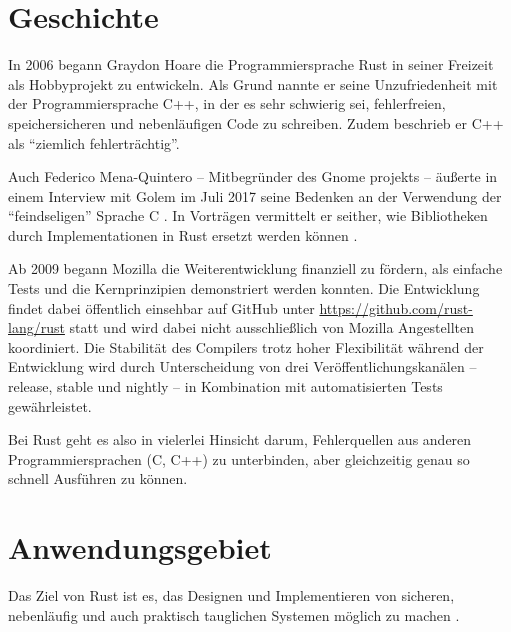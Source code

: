  \cite{rust:orly_y_rust}


\section{Geschichte}
\label{rust:history}

In 2006 \cite{rust:faq} begann Graydon Hoare die Programmiersprache Rust in seiner Freizeit als Hobbyprojekt zu entwickeln.
Als Grund nannte er seine Unzufriedenheit mit der Programmiersprache C++, in der es sehr schwierig sei, fehlerfreien, speichersicheren und nebenläufigen Code zu schreiben.
Zudem beschrieb er C++ als \enquote{ziemlich fehlerträchtig}. \cite{rust:heise_interview_graydon}

Auch Federico Mena-Quintero -- Mitbegründer des Gnome projekts  --
äußerte in einem Interview mit Golem im Juli 2017 seine Bedenken an der Verwendung der \enquote{feindseligen} Sprache C \cite{rust:c_is_hostile_golem}.
In Vorträgen  vermittelt er seither, wie Bibliotheken durch Implementationen in Rust ersetzt werden können \cite{rust:c_is_hostile_mena}.

Ab 2009 begann Mozilla die Weiterentwicklung finanziell zu fördern, als einfache Tests und die Kernprinzipien demonstriert werden konnten.
Die Entwicklung findet dabei öffentlich einsehbar auf GitHub unter \url{https://github.com/rust-lang/rust} statt und wird dabei nicht ausschließlich von Mozilla Angestellten koordiniert.
Die Stabilität des Compilers trotz hoher Flexibilität während der Entwicklung wird durch Unterscheidung von drei Veröffentlichungskanälen -- release, stable und nightly -- in Kombination mit automatisierten Tests  gewährleistet. \cite{rust:faq}


Bei Rust geht es also in vielerlei Hinsicht darum, Fehlerquellen aus anderen Programmiersprachen (C, C++) zu unterbinden, aber gleichzeitig genau so schnell Ausführen zu können.

\section{Anwendungsgebiet}

Das Ziel von Rust ist es, das Designen und Implementieren von sicheren, nebenläufig und auch praktisch tauglichen Systemen möglich zu machen \cite{rust:faq}.

